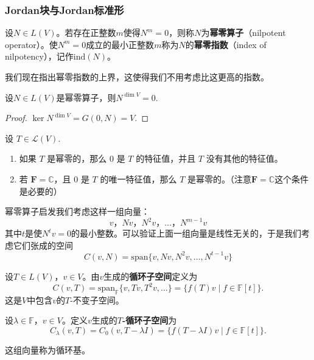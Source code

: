 \subsubsection{Jordan块与Jordan标准形}
\begin{definition}[幂零算子]
设$N \in L(V)$。若存在正整数$m$使得$N^m = 0$，则称$N$为\textbf{幂零算子}（nilpotent operator）。使$N^m = 0$成立的最小正整数$m$称为$N$的\textbf{幂零指数}（index of nilpotency），记作$\mathrm{ind}(N)$。
\end{definition}

我们现在指出幂零指数的上界，这使得我们不用考虑比这更高的指数。

\begin{theorem}[幂零指数的上界]
设$N \in L(V)$是幂零算子，则$N^{\dim V}=0$.
\end{theorem}

\begin{proof}
    $\ker N^{\dim V}=G(0, N)=V$.
\end{proof}
\begin{theorem}[幂零算子的特征值]
设 $T \in \mathcal{L}(V)$.

\begin{enumerate}
    \item[1.] 如果 $T$ 是幂零的，那么 $0$ 是 $T$ 的特征值，并且 $T$ 没有其他的特征值。
    \item[2.] 若 $\mathbf{F} = \mathbb{C}$，且 $0$ 是 $T$ 的唯一特征值，那么 $T$ 是幂零的。（注意$\mathbf{F} = \mathbb{C}$这个条件是必要的）
\end{enumerate}
\end{theorem}

幂零算子启发我们考虑这样一组向量：
\[
v，Nv，N^2v，\ldots，N^{m-1} v
\]
其中$t$是使$N^t v=0$的最小整数。可以验证上面一组向量是线性无关的，于是我们考虑它们张成的空间
\[
C(v,N)=\mathrm{span}\{v,Nv,N^2v,\ldots,N^{t-1}v\}
\]
\begin{definition}[循环子空间与循环模]
设$T \in L(V)$，$v \in V$。由$v$生成的\textbf{循环子空间}定义为
\[
C(v, T) = \mathrm{span}_{\mathbb{F}}\{v, Tv, T^2v, \ldots\} = \{f(T)v \mid f \in \mathbb{F}[t]\}.
\]
这是$V$中包含$v$的$T$-不变子空间。
\end{definition}

\begin{definition}[$T$-循环子空间]
设$\lambda \in \mathbb{F}$，$v \in V$。定义$v$生成的\textbf{$T$-循环子空间}为
\[
C_{\lambda}(v, T) = C_0(v, T-\lambda I) = \{f(T-\lambda I)v \mid f \in \mathbb{F}[t]\}.
\]
\end{definition}
这组向量称为循环基。

